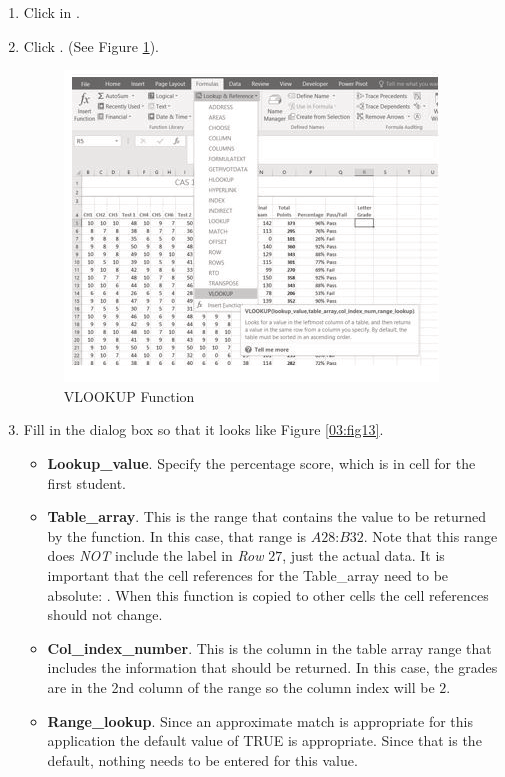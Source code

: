 \begin{enumbox}
	\begin{enumerate}
		\item Click in .
		\item Click . (See Figure \ref{03:fig12}).

		\begin{figure}[H]
			\centering
			\includegraphics[width=\maxwidth{.95\linewidth}]{gfx/ch03_fig12}
			\caption{VLOOKUP Function}
			\label{03:fig12}
		\end{figure}
		
		\item Fill in the dialog box so that it looks like Figure \ref{03:fig13}.
		
		\begin{itemize}
			\item \textbf{Lookup\_value}. Specify the percentage score, which is in cell  for the first student.
			\item \textbf{Table\_array}. This is the range that contains the value to be returned by the function. In this case, that range is $ A28 $:$ B32 $. Note that this range does \textit{NOT} include the label in \textit{Row} $ 27 $, just the actual data. It is important that the cell references for the Table\_array need to be absolute: . When this function is copied to other cells the cell references should not change.
			\item \textbf{Col\_index\_number}. This is the column in the table array range that includes the information that should be returned. In this case, the grades are in the 2nd column of the range so the column index will be $ 2 $.
			\item \textbf{Range\_lookup}. Since an approximate match is appropriate for this application the default value of TRUE is appropriate. Since that is the default, nothing needs to be entered for this value. 
		\end{itemize}


\end{enumerate}
\end{enumbox}
